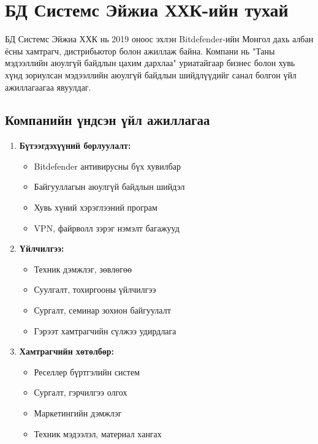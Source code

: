 \documentclass[main.tex]{subfiles}
\begin{document}
\section{БД Системс Эйжиа ХХК-ийн тухай}

БД Системс Эйжиа ХХК нь 2019 оноос эхлэн Bitdefender-ийн Монгол дахь албан ёсны хамтрагч, дистрибьютор болон ажиллаж байна. Компани нь "Таны мэдээллийн аюулгүй байдлын цахим дархлаа" уриатайгаар бизнес болон хувь хүнд зориулсан мэдээллийн аюулгүй байдлын шийдлүүдийг санал болгон үйл ажиллагаагаа явуулдаг.

\subsection{Компанийн үндсэн үйл ажиллагаа}

\begin{enumerate}
    \item \textbf{Бүтээгдэхүүний борлуулалт:}
    \begin{itemize}
        \item Bitdefender антивирусны бүх хувилбар
        \item Байгууллагын аюулгүй байдлын шийдэл
        \item Хувь хүний хэрэглээний програм
        \item VPN, файрволл зэрэг нэмэлт багажууд
    \end{itemize}
    
    \item \textbf{Үйлчилгээ:}
    \begin{itemize}
        \item Техник дэмжлэг, зөвлөгөө
        \item Суулгалт, тохиргооны үйлчилгээ
        \item Сургалт, семинар зохион байгуулалт
        \item Гэрээт хамтрагчийн сүлжээ удирдлага
    \end{itemize}
    
    \item \textbf{Хамтрагчийн хөтөлбөр:}
    \begin{itemize}
        \item Реселлер бүртгэлийн систем
        \item Сургалт, гэрчилгээ олгох
        \item Маркетингийн дэмжлэг
        \item Техник мэдээлэл, материал хангах
    \end{itemize}
\end{enumerate}
\end{document}

